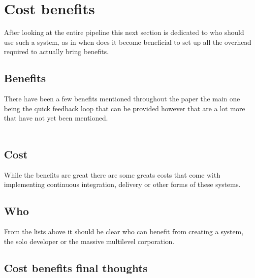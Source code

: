 %
%
%
%
%
%

\section{Cost benefits}
\label{sec:costbenefits}

After looking at the entire pipeline this next section is dedicated to who should use such a system, as in when does it become beneficial to set up all the overhead required to actually bring benefits.

\subsection{Benefits}

There have been a few benefits mentioned throughout the paper the main one being the quick feedback loop that can be provided however that are a lot more that have not yet been mentioned.
\\\\


\subsection{Cost}

While the benefits are great there are some greats costs that come with implementing continuous integration, delivery or other forms of these systems.

\subsection{Who}

From the lists above it should be clear who can benefit from creating a system, the solo developer or the massive multilevel corporation.

\subsection{Cost benefits final thoughts}